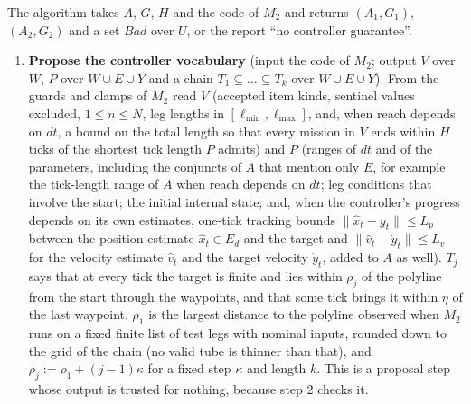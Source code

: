 \documentclass[10pt,a4paper]{article}
\makeatletter
\renewcommand\section{\@startsection{section}{1}{0pt}{0.8ex plus .2ex}{0.4ex}{\normalfont\large\bfseries}}
\newcommand{\Bad}{\mathit{Bad}}
\makeatother
\begin{document}
\section{The algorithm}

The algorithm takes $A$, $G$, $H$ and the code of $M_2$ and returns $(A_1,G_1)$, $(A_2,G_2)$ and a set $\Bad$ over $U$, or the report ``no controller guarantee''.

\begin{enumerate}\setlength{\itemsep}{1pt}\setlength{\parskip}{1pt}\setlength{\leftmargin}{1.2em}
\item \textbf{Propose the controller vocabulary} (input the code of $M_2$; output $V$ over $W$, $P$ over $W\cup E\cup Y$ and a chain $T_1\subseteq\dots\subseteq T_k$ over $W\cup E\cup Y$). From the guards and clamps of $M_2$ read $V$ (accepted item kinds, sentinel values excluded, $1\le n\le N$, leg lengths in $[\ell_{\min},\ell_{\max}]$, and, when reach depends on $dt$, a bound on the total length so that every mission in $V$ ends within $H$ ticks of the shortest tick length $P$ admits) and $P$ (ranges of $dt$ and of the parameters, including the conjuncts of $A$ that mention only $E$, for example the tick-length range of $A$ when reach depends on $dt$; leg conditions that involve the start; the initial internal state; and, when the controller's progress depends on its own estimates, one-tick tracking bounds $\lVert\hat x_t-y_t\rVert\le L_p$ between the position estimate $\hat x_t\in E_d$ and the target and $\lVert\hat v_t-\dot y_t\rVert\le L_v$ for the velocity estimate $\hat v_t$ and the target velocity $\dot y_t$, added to $A$ as well). $T_j$ says that at every tick the target is finite and lies within $\rho_j$ of the polyline from the start through the waypoints, and that some tick brings it within $\eta$ of the last waypoint. $\rho_1$ is the largest distance to the polyline observed when $M_2$ runs on a fixed finite list of test legs with nominal inputs, rounded down to the grid of the chain (no valid tube is thinner than that), and $\rho_j:=\rho_1+(j-1)\kappa$ for a fixed step $\kappa$ and length $k$. This is a proposal step whose output is trusted for nothing, because step 2 checks it.

\end{enumerate}
\end{document}
